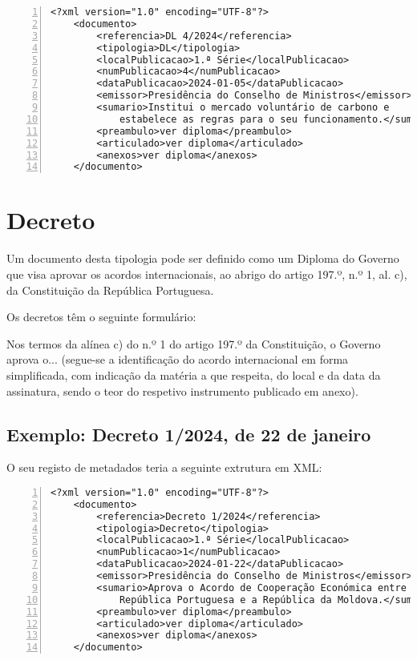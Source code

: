 \begin{Verbatim}[frame=single, numbers=left, fontsize=\small, commandchars=\\\{\}]
<?xml version="1.0" encoding="UTF-8"?>
    <documento>
        <referencia>DL 4/2024</referencia>
        <tipologia>DL</tipologia>
        <localPublicacao>1.ª Série</localPublicacao>
        <numPublicacao>4</numPublicacao>
        <dataPublicacao>2024-01-05</dataPublicacao>
        <emissor>Presidência do Conselho de Ministros</emissor>
        <sumario>Institui o mercado voluntário de carbono e 
            estabelece as regras para o seu funcionamento.</sumario>
        <preambulo>ver diploma</preambulo>
        <articulado>ver diploma</articulado>
        <anexos>ver diploma</anexos>
    </documento>
\end{Verbatim}


\section{Decreto}

Um documento desta tipologia pode ser definido como um Diploma do Governo que visa aprovar 
os acordos internacionais, ao abrigo do artigo 197.º, n.º 1, al. c), da Constituição da 
República Portuguesa.

Os decretos têm o seguinte formulário:

\begin{quoting}
    Nos termos da alínea c) do n.º 1 do artigo 197.º da Constituição, o Governo aprova 
    o... (segue-se a identificação do acordo internacional em forma simplificada, com 
    indicação da matéria a que respeita, do local e da data da assinatura, sendo o 
    teor do respetivo instrumento publicado em anexo).
\end{quoting}


\subsection{Exemplo: Decreto 1/2024, de 22 de janeiro} 
    
O seu registo de metadados teria a seguinte extrutura em XML:
    
\begin{Verbatim}[frame=single, numbers=left, fontsize=\small, commandchars=\\\{\}]
<?xml version="1.0" encoding="UTF-8"?>
    <documento>
        <referencia>Decreto 1/2024</referencia>
        <tipologia>Decreto</tipologia>
        <localPublicacao>1.ª Série</localPublicacao>
        <numPublicacao>1</numPublicacao>
        <dataPublicacao>2024-01-22</dataPublicacao>
        <emissor>Presidência do Conselho de Ministros</emissor>
        <sumario>Aprova o Acordo de Cooperação Económica entre a 
            República Portuguesa e a República da Moldova.</sumario>
        <preambulo>ver diploma</preambulo>
        <articulado>ver diploma</articulado>
        <anexos>ver diploma</anexos>
    </documento>
\end{Verbatim}


